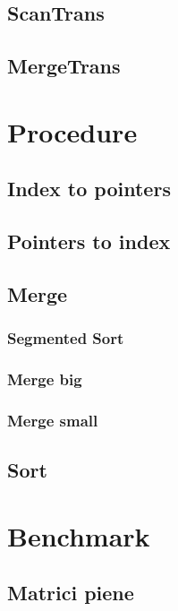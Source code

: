 \documentclass[]{IEEEtran}
\begin{document}
	\subsection{ScanTrans}
	
	
	\subsection{MergeTrans}
	

\section{Procedure}
\label{procedure}

	\subsection{Index to pointers}
	\label{idx-to-pnt}
	
	\subsection{Pointers to index}
	\label{pnt-to-idx}
	
	\subsection{Merge}
	\label{merge}
		\subsubsection{Segmented Sort}	

		\subsubsection{Merge big}	

		\subsubsection{Merge small}	
		
	\subsection{Sort}
	\label{sort}
	

\section{Benchmark}
\label{benchmark}
	\subsection{Matrici piene}
	
\end{document}
